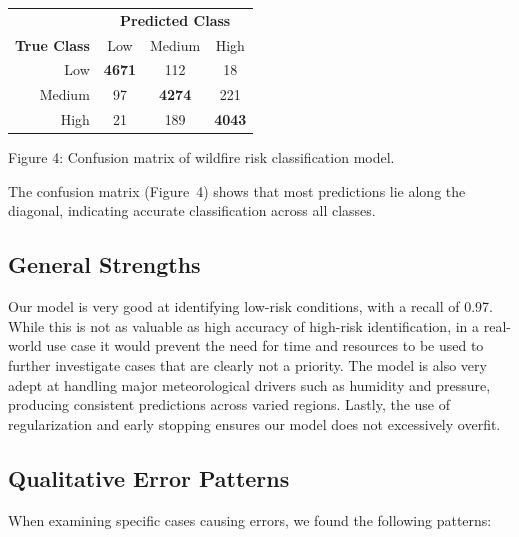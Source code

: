 \documentclass[11pt]{article}
\begin{document}
\vspace{1em}

\begin{center}
\begin{tabular}{r|ccc}
\hline
 & \multicolumn{3}{c}{\textbf{Predicted Class}} \\
\textbf{True Class} & Low & Medium & High \\
\hline
Low    & \textbf{4671} & 112 & 18 \\
Medium & 97            & \textbf{4274} & 221 \\
High   & 21            & 189 & \textbf{4043} \\
\hline
\end{tabular}

\small Figure 4: Confusion matrix of wildfire risk classification model.
\end{center}

The confusion matrix (Figure~4) shows that most predictions lie along the diagonal, indicating accurate classification across all classes.

\subsection{General Strengths}

Our model is very good at identifying low-risk conditions, with a recall of 0.97. While this is not as valuable as high accuracy of high-risk identification, in a real-world use case it would prevent the need for time and resources to be used to further investigate cases that are clearly not a priority. The model is also very adept at handling major meteorological drivers such as humidity and pressure, producing consistent predictions across varied regions. Lastly, the use of regularization and early stopping ensures our model does not excessively overfit.

\subsection{Qualitative Error Patterns}

When examining specific cases causing errors, we found the following patterns:
\end{document}
